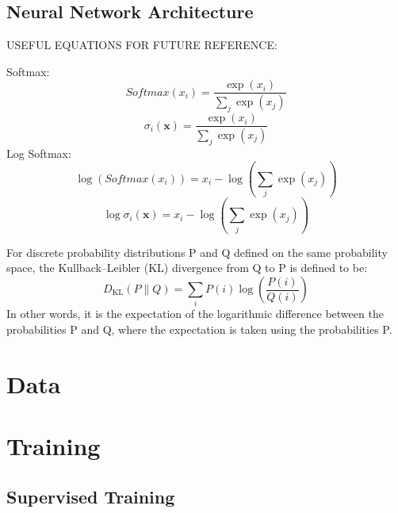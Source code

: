 \documentclass[twoside,twocolumn]{article}
\renewcommand{\vec}[1]{\mathbf{#1}}
\begin{document}
\subsection{Neural Network Architecture}

USEFUL EQUATIONS FOR FUTURE REFERENCE:

Softmax:
\begin{equation}
Softmax(x_i) = \frac{\exp(x_i)}{\sum_j\exp(x_j)}
\end{equation}
\begin{equation}
\sigma_i(\vec{x}) = \frac{\exp(x_i)}{\sum_j\exp(x_j)}
\end{equation}
Log Softmax: %
\begin{equation}
\log \left( Softmax(x_i) \right) = x_i - \log \left( \sum_j\exp(x_j) \right)
\end{equation}
\begin{equation}
\log  \sigma_i(\vec{x})  = x_i - \log \left( \sum_j\exp(x_j) \right)
\end{equation}

For discrete probability distributions P and Q defined on the same probability space, the Kullback–Leibler (KL) divergence from Q to P is defined to be:
\begin{equation}
D _ { \mathrm { KL } } ( P \| Q ) = \sum _ { i } P ( i ) \log \left( \frac { P ( i ) } { Q ( i ) } \right)
\end{equation}
In other words, it is the expectation of the logarithmic difference between the probabilities P and Q, where the expectation is taken using the probabilities P. 

\section{Data}

\section{Training}

\subsection{Supervised Training}
\end{document}
